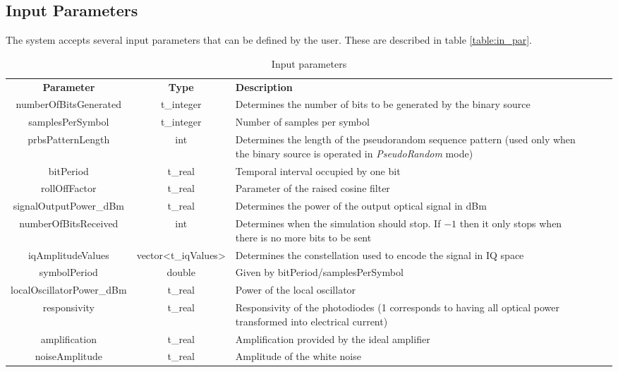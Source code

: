 \subsection*{Input Parameters}

The system accepts several input parameters that can be defined by the user. These are described in table \ref{table:in_par}.

\begin{table}[H]
	\centering
	\caption{Input parameters}
	\begin{tabular}{|c|c|p{70mm}|ccp{70mm}}
		\cline{1-3}
		\textbf{Parameter} & \textbf{Type} & \textbf{Description} &    \\ \cline{1-3}
		numberOfBitsGenerated & t\_integer & Determines the number of bits to be generated by the binary source  &    \\ \cline{1-3}
		samplesPerSymbol & t\_integer & Number of samples per symbol &    \\ \cline{1-3}
		prbsPatternLength & int & Determines the length of the pseudorandom sequence pattern (used only when the binary source is operated in \textit{PseudoRandom} mode) &    \\ \cline{1-3}
		bitPeriod & t\_real & Temporal interval occupied by one bit &    \\ \cline{1-3}
		rollOffFactor & t\_real & Parameter of the raised cosine filter &    \\ \cline{1-3}
		signalOutputPower\_dBm & t\_real & Determines the power of the output optical signal in dBm &  \\ \cline{1-3}
		numberOfBitsReceived & int &   Determines when the simulation should stop. If $-1$ then it only stops when there is no more bits to be sent&   \\ \cline{1-3}
		iqAmplitudeValues & vector<t\_iqValues> & Determines the constellation used to encode the signal in IQ space &    \\ \cline{1-3}
		symbolPeriod & double & Given by bitPeriod/samplesPerSymbol &    \\ \cline{1-3}
		localOscillatorPower\_dBm & t\_real & Power of the local oscillator &    \\ \cline{1-3}
		responsivity & t\_real & Responsivity of the photodiodes (1 corresponds to having all optical power transformed into electrical current) &    \\ \cline{1-3}
		amplification & t\_real & Amplification provided by the ideal amplifier &    \\ \cline{1-3}
		noiseAmplitude & t\_real & Amplitude of the white noise &    \\ \cline{1-3}

\end{tabular}
\end{table}
